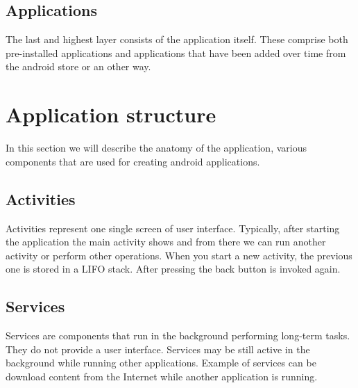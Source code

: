 \subsection{Applications}
The last and highest layer consists of the application itself. These comprise both pre-installed applications and applications that have been added over time from the android store or an other way.

\section{Application structure}
In this section we will describe the anatomy of the application, various components that are used for creating android applications.

\subsection{Activities}%
Activities represent one single screen of user interface. Typically, after starting the application the main activity shows and from there we can run another activity or perform other operations. When you start a new activity, the previous one is stored in a LIFO stack. After pressing the back button is invoked again.

\subsection{Services}
Services are components that run in the background performing long-term tasks. They do not provide a user interface. Services may be still active in the background while running other applications. Example of services can be download content from the Internet while another application is running.

